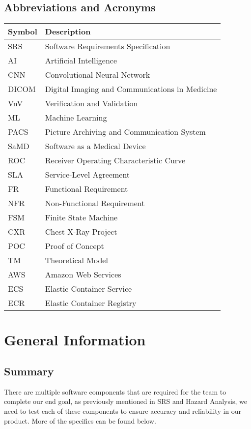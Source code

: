 \documentclass[12pt, titlepage]{article}
\begin{document}
\subsection{Abbreviations and Acronyms}
\renewcommand{\arraystretch}{1.3}
\noindent \begin{tabular}{l l} 
  \toprule		
  \textbf{Symbol} & \textbf{Description}\\
  \midrule 
  SRS & Software Requirements Specification\\
  AI & Artificial Intelligence\\
  CNN & Convolutional Neural Network\\
  DICOM & Digital Imaging and Communications in Medicine\\
  VnV & Verification and Validation\\
  ML & Machine Learning\\
  PACS & Picture Archiving and Communication System\\
  SaMD & Software as a Medical Device\\
  ROC & Receiver Operating Characteristic Curve\\
  SLA & Service-Level Agreement\\
  FR & Functional Requirement\\
  NFR & Non-Functional Requirement\\
  FSM & Finite State Machine\\
  CXR & Chest X-Ray Project\\
  POC & Proof of Concept\\
  TM & Theoretical Model\\
  AWS & Amazon Web Services\\
  ECS & Elastic Container Service\\
  ECR & Elastic Container Registry\\
  \bottomrule
\end{tabular}
\newpage


\section{General Information}

\subsection{Summary}
There are multiple software components that are required for the team to complete our end goal, as previously mentioned in SRS and Hazard Analysis, we need to test each of these components to ensure accuracy and reliability in our product. More of the specifics can be found below.  
\end{document}
